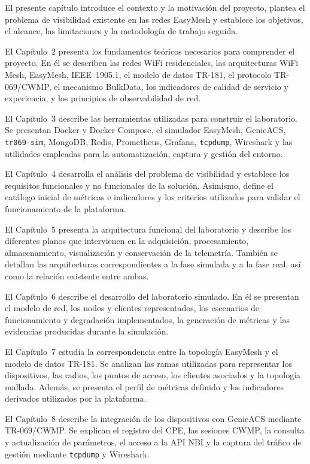El presente capítulo introduce el contexto y la motivación del proyecto,
plantea el problema de visibilidad existente en las redes EasyMesh y
establece los objetivos, el alcance, las limitaciones y la metodología de
trabajo seguida.

El Capítulo~2 presenta los fundamentos teóricos necesarios para
comprender el proyecto. En él se describen las redes WiFi residenciales,
las arquitecturas WiFi Mesh, EasyMesh, IEEE~1905.1, el modelo de datos
TR-181, el protocolo TR-069/CWMP, el mecanismo BulkData, los indicadores
de calidad de servicio y experiencia, y los principios de observabilidad
de red.

El Capítulo~3 describe las herramientas utilizadas para construir el
laboratorio. Se presentan Docker y Docker Compose, el simulador EasyMesh,
GenieACS, \texttt{tr069-sim}, MongoDB, Redis, Prometheus, Grafana,
\texttt{tcpdump}, Wireshark y las utilidades empleadas para la
automatización, captura y gestión del entorno.

El Capítulo~4 desarrolla el análisis del problema de visibilidad y
establece los requisitos funcionales y no funcionales de la solución.
Asimismo, define el catálogo inicial de métricas e indicadores y los
criterios utilizados para validar el funcionamiento de la plataforma.

El Capítulo~5 presenta la arquitectura funcional del laboratorio y
describe los diferentes planos que intervienen en la adquisición,
procesamiento, almacenamiento, visualización y conservación de la
telemetría. También se detallan las arquitecturas correspondientes a la
fase simulada y a la fase real, así como la relación existente entre
ambas.

El Capítulo~6 describe el desarrollo del laboratorio simulado. En él se
presentan el modelo de red, los nodos y clientes representados, los
escenarios de funcionamiento y degradación implementados, la generación
de métricas y las evidencias producidas durante la simulación.

El Capítulo~7 estudia la correspondencia entre la topología EasyMesh y el
modelo de datos TR-181. Se analizan las ramas utilizadas para representar
los dispositivos, las radios, los puntos de acceso, los clientes
asociados y la topología mallada. Además, se presenta el perfil de
métricas definido y los indicadores derivados utilizados por la
plataforma.

El Capítulo~8 describe la integración de los dispositivos con GenieACS
mediante TR-069/CWMP. Se explican el registro del CPE, las sesiones CWMP,
la consulta y actualización de parámetros, el acceso a la API NBI y la
captura del tráfico de gestión mediante \texttt{tcpdump} y Wireshark.

